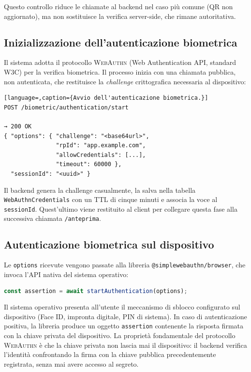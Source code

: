 Questo controllo riduce le chiamate al backend nel caso più comune
(QR non aggiornato), ma non sostituisce la verifica server-side, che
rimane autoritativa.

\subsection{Inizializzazione dell'autenticazione biometrica}
\label{subsec:biometria-start}

Il sistema adotta il protocollo \textsc{WebAuthn} (Web Authentication
API, standard \textsc{W3C}) per la verifica biometrica. Il processo
inizia con una chiamata pubblica, non autenticata, che restituisce la
\emph{challenge} crittografica necessaria al dispositivo:

\begin{lstlisting}[language=,caption={Avvio dell'autenticazione biometrica.}]
POST /biometric/authentication/start

→ 200 OK
{ "options": { "challenge": "<base64url>",
               "rpId": "app.example.com",
               "allowCredentials": [...],
               "timeout": 60000 },
  "sessionId": "<uuid>" }
\end{lstlisting}

Il backend genera la challenge casualmente, la salva nella tabella
\texttt{WebAuthnCredentials} con un TTL di cinque minuti e associa la
voce al \texttt{sessionId}. Quest'ultimo viene restituito al client per
collegare questa fase alla successiva chiamata \texttt{/anteprima}.

\subsection{Autenticazione biometrica sul dispositivo}
\label{subsec:biometria-device}

Le \texttt{options} ricevute vengono passate alla libreria
\texttt{@simplewebauthn/browser}, che invoca l'API nativa del sistema
operativo:

\begin{lstlisting}[language=TypeScript,caption={Esecuzione della biometria lato client.}]
const assertion = await startAuthentication(options);
\end{lstlisting}

Il sistema operativo presenta all'utente il meccanismo di sblocco
configurato sul dispositivo (Face ID, impronta digitale, PIN di
sistema). In caso di autenticazione positiva, la libreria produce un
oggetto \texttt{assertion} contenente la risposta firmata con la chiave
privata del dispositivo. La proprietà fondamentale del protocollo
\textsc{WebAuthn} è che la chiave privata non lascia mai il dispositivo:
il backend verifica l'identità confrontando la firma con la chiave
pubblica precedentemente registrata, senza mai avere accesso al segreto.

